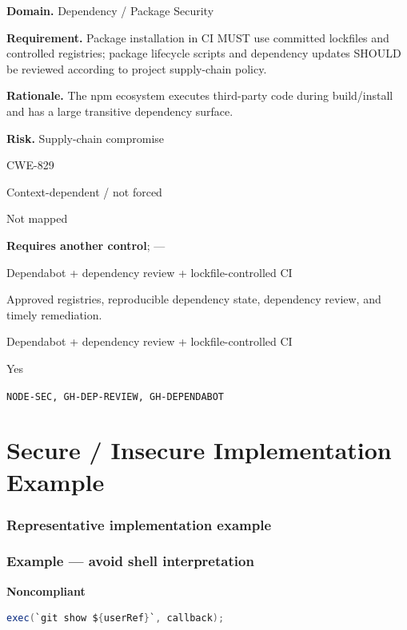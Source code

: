 \documentclass[10pt,letterpaper]{article}
\newcommand{\prioritybadge}[2]{\tcbox[on line,boxrule=0pt,arc=1.2mm,boxsep=0.7mm,left=1mm,right=1mm,top=0.4mm,bottom=0.4mm,colback=#2!12,coltext=#2]{\scriptsize\bfseries #1}}
\begin{document}
\begin{rulebox}[title={\texttt{SCS-JS-DEP-001} \hfill \prioritybadge{Critical Control}{Critical}}]
\textbf{Domain.} Dependency / Package Security

\textbf{Requirement.} Package installation in CI MUST use committed lockfiles and controlled registries; package lifecycle scripts and dependency updates SHOULD be reviewed according to project supply-chain policy.

\textbf{Rationale.} The npm ecosystem executes third-party code during build/install and has a large transitive dependency surface.

\textbf{Risk.} Supply-chain compromise

\begin{description}[leftmargin=2.65cm,labelwidth=2.3cm,style=nextline,itemsep=1pt,topsep=3pt]
  \item[CWE] CWE-829
  \item[OWASP] Context-dependent / not forced
  \item[CERT] Not mapped
  \item[CodeQL] \textbf{Requires another control}; ---
  \item[Enforcement] Dependabot + dependency review + lockfile-controlled CI
  \item[Prevention] Approved registries, reproducible dependency state, dependency review, and timely remediation.
  \item[Verification] Dependabot + dependency review + lockfile-controlled CI
  \item[Automation] Yes
  \item[Sources] \texttt{NODE-SEC, GH-DEP-REVIEW, GH-DEPENDABOT}
\end{description}
\end{rulebox}
\section{Secure / Insecure Implementation Example}
\subsubsection*{Representative implementation example}
\subsubsection*{Example --- avoid shell interpretation}

\textbf{Noncompliant}\par
\begin{lstlisting}[language={Java}]
exec(`git show ${userRef}`, callback);
\end{lstlisting}
\end{document}
